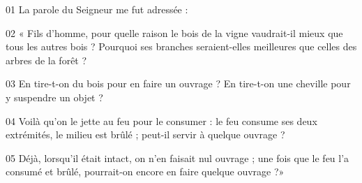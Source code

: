 01 La parole du Seigneur me fut adressée :

02 « Fils d’homme, pour quelle raison le bois de la vigne vaudrait-il mieux que tous les autres bois ? Pourquoi ses branches seraient-elles meilleures que celles des arbres de la forêt ?

03 En tire-t-on du bois pour en faire un ouvrage ? En tire-t-on une cheville pour y suspendre un objet ?

04 Voilà qu’on le jette au feu pour le consumer : le feu consume ses deux extrémités, le milieu est brûlé ; peut-il servir à quelque ouvrage ?

05 Déjà, lorsqu’il était intact, on n’en faisait nul ouvrage ; une fois que le feu l’a consumé et brûlé, pourrait-on encore en faire quelque ouvrage ?»
